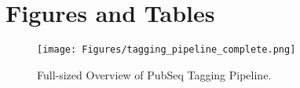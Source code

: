 
\chapter{Figures and Tables} %

\label{AppendixB} %


\begin{sidewaysfigure}[ht]
    \texttt{[image: Figures/tagging\_pipeline\_complete.png]}
    \caption[Overview of PubSeq Tagging Pipeline with all essential programs showed as nodes and important input/output files shown]{Full-sized Overview of PubSeq Tagging Pipeline.}
    \label{fig:PubSeqTaggingFull}
\end{sidewaysfigure}